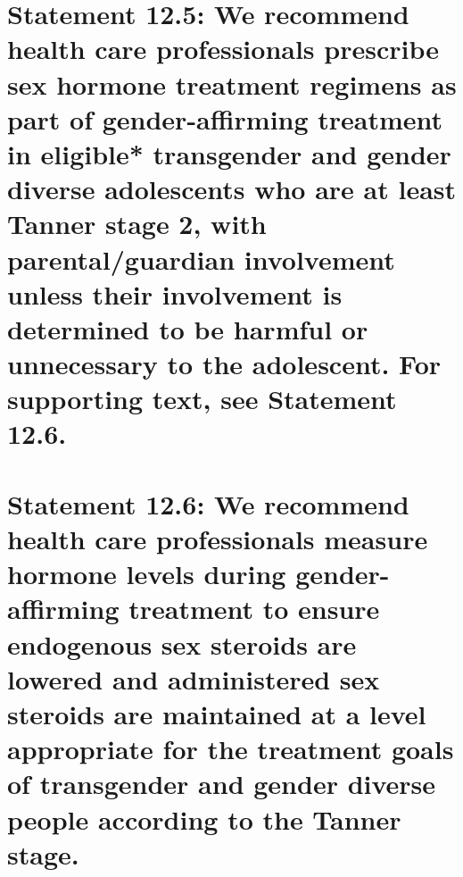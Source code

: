 \documentclass[
]{book}
\begin{document}
\hypertarget{statement-12.5-we-recommend-health-care-professionals-prescribe-sex-hormone-treatment-regimens-as-part-of-gender-affirming-treatment-in-eligible-transgender-and-gender-diverse-adolescents-who-are-at-least-tanner-stage-2-with-parentalguardian-involvement-unless-their-involvement-is-determined-to-be-harmful-or-unnecessary-to-the-adolescent.-for-supporting-text-see-statement-12.6.}{%
\section*{Statement 12.5: We recommend health care professionals prescribe sex hormone treatment regimens as part of gender-affirming treatment in eligible* transgender and gender diverse adolescents who are at least Tanner stage 2, with parental/guardian involvement unless their involvement is determined to be harmful or unnecessary to the adolescent. For supporting text, see Statement 12.6.}\label{statement-12.5-we-recommend-health-care-professionals-prescribe-sex-hormone-treatment-regimens-as-part-of-gender-affirming-treatment-in-eligible-transgender-and-gender-diverse-adolescents-who-are-at-least-tanner-stage-2-with-parentalguardian-involvement-unless-their-involvement-is-determined-to-be-harmful-or-unnecessary-to-the-adolescent.-for-supporting-text-see-statement-12.6.}}

\hypertarget{statement-12.6-we-recommend-health-care-professionals-measure-hormone-levels-during-gender-affirming-treatment-to-ensure-endogenous-sex-steroids-are-lowered-and-administered-sex-steroids-are-maintained-at-a-level-appropriate-for-the-treatment-goals-of-transgender-and-gender-diverse-people-according-to-the-tanner-stage.}{%
\section*{Statement 12.6: We recommend health care professionals measure hormone levels during gender-affirming treatment to ensure endogenous sex steroids are lowered and administered sex steroids are maintained at a level appropriate for the treatment goals of transgender and gender diverse people according to the Tanner stage.}\label{statement-12.6-we-recommend-health-care-professionals-measure-hormone-levels-during-gender-affirming-treatment-to-ensure-endogenous-sex-steroids-are-lowered-and-administered-sex-steroids-are-maintained-at-a-level-appropriate-for-the-treatment-goals-of-transgender-and-gender-diverse-people-according-to-the-tanner-stage.}}
\end{document}
